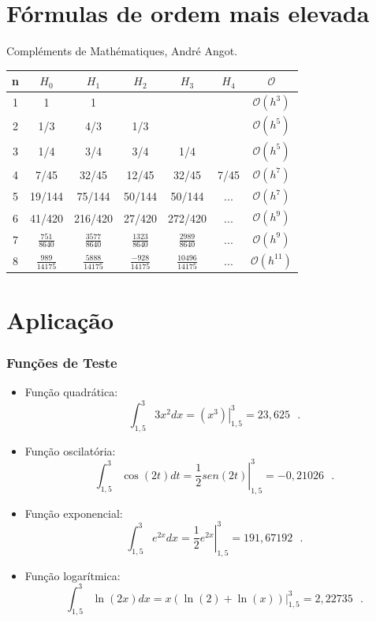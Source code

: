 \documentclass[xcolor=table]{beamer}
\begin{document}
\section{Fórmulas de ordem mais elevada}
\begin{frame}
Compléments de Mathématiques, André Angot.
\begin{center}
	\begin{tabular}{ c c c c c c c }
		\rowcolor{Maroon}
		n & $H_{0}$ & $H_{1}$ & $H_{2}$ & $H_{3}$ & $H_{4}$ & $\mathcal{O}$ \\ 
		\hline \hline
		\rowcolor{Maroon!50}
		1 & 1 & 1 & & & & $\mathcal{O}\left(h^{3}\right)$ \\  
		\rowcolor{Maroon!10}
		2 & 1/3 & 4/3 & 1/3 & & & $\mathcal{O}\left(h^{5}\right)$ \\  
		\rowcolor{Maroon!50}
		3 & 1/4 & 3/4 & 3/4 & 1/4 & & $\mathcal{O}\left(h^{5}\right)$  \\  
		\rowcolor{Maroon!10}
		4 & 7/45 & 32/45 & 12/45 & 32/45 & 7/45 & $\mathcal{O}\left(h^{7}\right)$ \\ 
		\rowcolor{Maroon!50}
		5 & 19/144 & 75/144 & 50/144 & 50/144 & $...$ & $\mathcal{O}\left(h^{7}\right)$ \\  
		\rowcolor{Maroon!10}
		6 & 41/420 & 216/420 & 27/420 & 272/420 & $...$ & $\mathcal{O}\left(h^{9}\right)$ \\ 
		\rowcolor{Maroon!50}
		7 & $ \frac{751}{8640} $ & $ \frac{3577}{8640}$ & $\frac{1323}{8640}$ & $\frac{2989}{8640}$ & $...$ & $\mathcal{O}\left(h^{9}\right)$ \\  
		\rowcolor{Maroon!10}
		8 & $ \frac{989}{14175}$ & $\frac{5888}{14175}$ & $\frac{-928}{14175}$ & $\frac{10496}{14175}$ & $...$ & $\mathcal{O}\left(h^{11}\right)$
	\end{tabular}
\end{center}
\end{frame}

\section{Aplicação}
\begin{frame}
\frametitle{Funções de Teste}
\begin{itemize}
	\item Função quadrática:
	\[ \int_{1,5}^{3} 3x^{2}dx = \left. (x^{3}) \right|_{1,5}^{3} = 23,625 \ \ \ . \]
	\item Função oscilatória:
	\[ \int_{1,5}^{3} \cos(2t)dt = \left.\frac{1}{2} sen(2t) \right|_{1,5}^{3} = -0,21026 \ \ \ . \]
	\item Função exponencial:
	\[ \int_{1,5}^{3} e^{2x}dx = \left.\frac{1}{2} e^{2x} \right|_{1,5}^{3} = 191,67192 \ \ \ . \]
	\item Função logarítmica:
	\[ \int_{1,5}^{3} \ln(2x)dx = \left. x(\ln(2) + \ln(x)) \right|_{1,5}^{3} = 2,22735 \ \ \ . \]
\end{itemize}
\end{frame}
\end{document}
